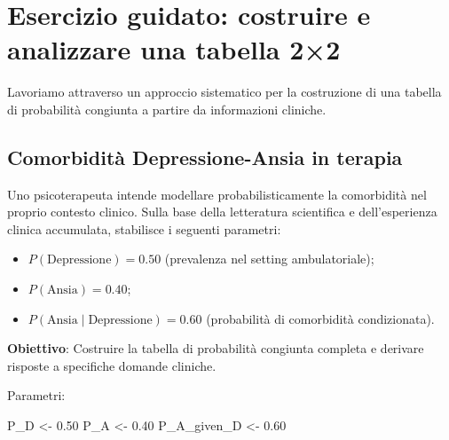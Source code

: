 \documentclass[
  letterpaper,
  DIV=11,
  numbers=noendperiod,
  oneside]{scrreprt}
\newenvironment{Shaded}{\begin{snugshade}}{\end{snugshade}}
\newcommand{\FloatTok}[1]{\textcolor[rgb]{0.68,0.00,0.00}{#1}}
\newcommand{\NormalTok}[1]{\textcolor[rgb]{0.00,0.23,0.31}{#1}}
\newcommand{\OtherTok}[1]{\textcolor[rgb]{0.00,0.23,0.31}{#1}}
\providecommand{\tightlist}{%
  \setlength{\itemsep}{0pt}\setlength{\parskip}{0pt}}
\theoremstyle{definition}
\theoremstyle{plain}
\theoremstyle{definition}
\theoremstyle{remark}
\begin{document}
\section{Esercizio guidato: costruire e analizzare una tabella
2×2}\label{esercizio-guidato-costruire-e-analizzare-una-tabella-22}

Lavoriamo attraverso un approccio sistematico per la costruzione di una
tabella di probabilità congiunta a partire da informazioni cliniche.

\begin{tcolorbox}[enhanced jigsaw, arc=.35mm, breakable, colbacktitle=quarto-callout-tip-color!10!white, opacityback=0, toprule=.15mm, rightrule=.15mm, colback=white, opacitybacktitle=0.6, leftrule=.75mm, coltitle=black, bottomtitle=1mm, left=2mm, toptitle=1mm, title=\textcolor{quarto-callout-tip-color}{\faLightbulb}\hspace{0.5em}{Scenario clinico}, titlerule=0mm, bottomrule=.15mm, colframe=quarto-callout-tip-color-frame]

\subsection{Comorbidità Depressione-Ansia in
terapia}\label{comorbidituxe0-depressione-ansia-in-terapia}

Uno psicoterapeuta intende modellare probabilisticamente la comorbidità
nel proprio contesto clinico. Sulla base della letteratura scientifica e
dell'esperienza clinica accumulata, stabilisce i seguenti parametri:

\begin{itemize}
\tightlist
\item
  \(P(\text{Depressione}) = 0.50\) (prevalenza nel setting
  ambulatoriale);
\item
  \(P(\text{Ansia}) = 0.40\);
\item
  \(P(\text{Ansia} \mid \text{Depressione}) = 0.60\) (probabilità di
  comorbidità condizionata).
\end{itemize}

\textbf{Obiettivo}: Costruire la tabella di probabilità congiunta
completa e derivare risposte a specifiche domande cliniche.

\end{tcolorbox}

Parametri:

\begin{Shaded}
\begin{Highlighting}[]
\NormalTok{P\_D }\OtherTok{\textless{}{-}} \FloatTok{0.50}
\NormalTok{P\_A }\OtherTok{\textless{}{-}} \FloatTok{0.40}
\NormalTok{P\_A\_given\_D }\OtherTok{\textless{}{-}} \FloatTok{0.60}
\end{Highlighting}
\end{Shaded}
\end{document}
